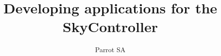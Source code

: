 \documentclass[a4paper,11pt]{article}
\begin{document}


\title{Developing applications for the SkyController}
\author{Parrot SA}
\maketitle

\newpage

\tableofcontents

\newpage



\newpage



\newpage



\newpage



\newpage



\newpage



\newpage


\end{document}
